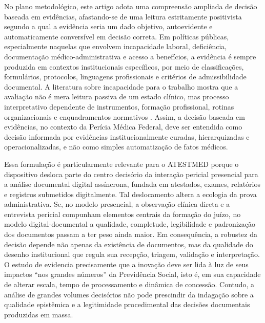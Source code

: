 \documentclass[12pt,a4paper]{article}
\begin{document}
No plano metodológico, este artigo adota uma compreensão ampliada de decisão baseada em evidências, afastando-se de uma leitura estritamente positivista segundo a qual a evidência seria um dado objetivo, autoevidente e automaticamente conversível em decisão correta. Em políticas públicas, especialmente naquelas que envolvem incapacidade laboral, deficiência, documentação médico-administrativa e acesso a benefícios, a evidência é sempre produzida em contextos institucionais específicos, por meio de classificações, formulários, protocolos, linguagens profissionais e critérios de admissibilidade documental. A literatura sobre incapacidade para o trabalho mostra que a avaliação não é mera leitura passiva de um estado clínico, mas processo interpretativo dependente de instrumentos, formação profissional, rotinas organizacionais e enquadramentos normativos \parencite{steenbeek2011thedevelopmentofinstrumentstomeasuretheworkdisa,dijkstrasdatamakingupincapacityforwork}. Assim, a decisão baseada em evidências, no contexto da Perícia Médica Federal, deve ser entendida como decisão informada por evidências institucionalmente curadas, hierarquizadas e operacionalizadas, e não como simples automatização de fatos médicos.

Essa formulação é particularmente relevante para o ATESTMED porque o dispositivo desloca parte do centro decisório da interação pericial presencial para a análise documental digital assíncrona, fundada em atestados, exames, relatórios e registros submetidos digitalmente. Tal deslocamento altera a ecologia da prova administrativa. Se, no modelo presencial, a observação clínica direta e a entrevista pericial compunham elementos centrais da formação do juízo, no modelo digital-documental a qualidade, completude, legibilidade e padronização dos documentos passam a ter peso ainda maior. Em consequência, a robustez da decisão depende não apenas da existência de documentos, mas da qualidade do desenho institucional que regula sua recepção, triagem, validação e interpretação. O estudo de \textcite{soares20241031t0000000000asistematicadoatestmednaconcessa} evidencia precisamente que a inovação deve ser lida à luz de seus impactos “nos grandes números” da Previdência Social, isto é, em sua capacidade de alterar escala, tempo de processamento e dinâmica de concessão. Contudo, a análise de grandes volumes decisórios não pode prescindir da indagação sobre a qualidade epistêmica e a legitimidade procedimental das decisões documentais produzidas em massa.
\end{document}
